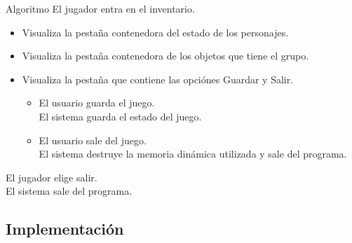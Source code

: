 \documentclass[9pt,xcolor=svgnames]{beamer}
\begin{document}
  
  \begin{frame}{Algoritmo}
   El jugador entra en el inventario.
   
   \begin{itemize}
    \item Visualiza la pestaña contenedora del estado de los
	  personajes.
    \item Visualiza la pestaña contenedora de los objetos que tiene el
	  grupo.
    \item Visualiza la pestaña que contiene las opciónes Guardar y
	  Salir.
	  
	  \begin{itemize}
	   \item El usuario guarda el juego.\\
		 El sistema guarda el estado del juego.
	   \item El usuario sale del juego.\\
		 El sistema destruye la memoria dinámica utilizada y
		 sale del programa.		  
	  \end{itemize}
   \end{itemize}
    
   El jugador elige salir.\\
   El sistema sale del programa.
  \end{frame}
    
    
  \subsection{Implementación}
  
\end{document}
